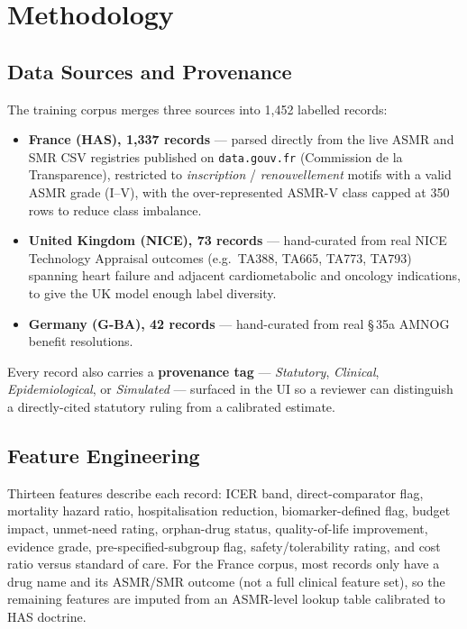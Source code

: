 \documentclass[11pt,a4paper]{article}
\begin{document}
\section{Methodology}

\subsection{Data Sources and Provenance}
The training corpus merges three sources into 1,452 labelled records:
\begin{itemize}[leftmargin=1.3em]
  \item \textbf{France (HAS), 1,337 records} --- parsed directly from the live ASMR and SMR CSV
  registries published on \texttt{data.gouv.fr} (Commission de la Transparence), restricted to
  \emph{inscription} / \emph{renouvellement} motifs with a valid ASMR grade (I--V), with the
  over-represented ASMR-V class capped at 350 rows to reduce class imbalance.
  \item \textbf{United Kingdom (NICE), 73 records} --- hand-curated from real NICE Technology
  Appraisal outcomes (e.g.\ TA388, TA665, TA773, TA793) spanning heart failure and adjacent
  cardiometabolic and oncology indications, to give the UK model enough label diversity.
  \item \textbf{Germany (G-BA), 42 records} --- hand-curated from real \S\,35a AMNOG benefit
  resolutions.
\end{itemize}
Every record also carries a \textbf{provenance tag} --- \emph{Statutory}, \emph{Clinical},
\emph{Epidemiological}, or \emph{Simulated} --- surfaced in the UI so a reviewer can distinguish a
directly-cited statutory ruling from a calibrated estimate.

\subsection{Feature Engineering}
Thirteen features describe each record: ICER band, direct-comparator flag, mortality hazard
ratio, hospitalisation reduction, biomarker-defined flag, budget impact, unmet-need rating,
orphan-drug status, quality-of-life improvement, evidence grade, pre-specified-subgroup flag,
safety/tolerability rating, and cost ratio versus standard of care. For the France corpus, most
records only have a drug name and its ASMR/SMR outcome (not a full clinical feature set), so the
remaining features are imputed from an ASMR-level lookup table calibrated to HAS doctrine.
\end{document}
